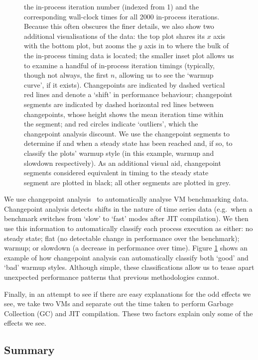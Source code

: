 \documentclass[acmsmall,screen]{acmart}
\newcommand{\numiterations}{2000\xspace}
\begin{document}
\begin{figure}[t]
{the in-process iteration number (indexed from 1) and the corresponding wall-clock
times for all \numiterations in-process iterations. Because this often obscures the finer
details, we also show two additional visualisations of the data: the top plot
shares its $x$ axis with the bottom plot, but zooms the $y$ axis in to where the bulk of the
in-process timing data is located; the smaller inset plot allows us to examine a handful
of in-process iteration timings (typically, though not always, the first $n$,
allowing us to see the `warmup curve', if it exists). Changepoints
are indicated by dashed vertical red lines and denote a `shift' in performance behaviour;
changepoint segments are indicated by dashed horizontal red lines between changepoints,
whose height shows the mean iteration time within the segment;
and red circles indicate `outliers', which the changepoint analysis discount. We use the changepoint
segments to determine if and when a steady state has been reached and,
if so, to classify the plots' warmup style (in this example, warmup and
slowdown respectively). As an additional visual aid, changepoint segments
considered equivalent in timing to the steady state segment are plotted in black;
all other segments are plotted in grey.}
\label{fig:changepoint}
\end{figure}

We use changepoint analysis~\cite{eckley11analysis} to
automatically analyse VM benchmarking data. Changepoint analysis detects
shifts in the nature of time series data (e.g.~when a benchmark switches
from `slow' to `fast' modes after JIT compilation). We then use this
information to automatically classify each process execution as either:
no steady state; flat (no detectable change in performance
over the benchmark); warmup; or slowdown (a decrease in performance over time).
Figure \ref{fig:changepoint} shows an example of how changepoint analysis
can automatically classify both `good' and `bad' warmup styles.
Although simple, these classifications allow us to tease apart
unexpected performance patterns that previous methodologies cannot.

Finally, in an attempt to see if there are easy explanations for the odd
effects we see, we take two VMs and separate out the
time taken to perform Garbage Collection (GC) and JIT compilation. These
two factors explain only some of the effects we see.


\subsection{Summary}
\end{document}
